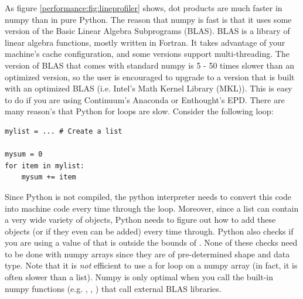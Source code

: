 As figure \ref{performance:fig:lineprofiler} shows, dot products are much faster in numpy than in pure Python.  The reason that numpy is fast is that it uses some version of the Basic Linear Algebra Subprograms (BLAS).  BLAS is a library of linear algebra functions, mostly written in Fortran.  It takes advantage of your machine's cache configuration, and some versions support multi-threading.  The version of BLAS that comes with standard numpy is 5 - 50 times slower than an optimized version, so the user is encouraged to upgrade to a version that is built with an optimized BLAS (i.e. Intel's Math Kernel Library (MKL)).  This is easy to do if you are using Continuum's Anaconda or Enthought's EPD.  There are many reason's that Python for loops are slow.  Consider the following loop:
\begin{verbatim}
mylist = ... # Create a list

mysum = 0
for item in mylist:
    mysum += item
\end{verbatim}
Since Python is not compiled, the python interpreter needs to convert this code into machine code every time through the loop.  Moreover, since a list can contain a very wide variety of objects, Python needs to figure out how to add these objects (or if they even can be added) every time through.  Python also checks if you are using a value of  that is outside the bounds of .  None of these checks need to be done with numpy arrays since they are of pre-determined shape and data type.  Note that it is \emph{not} efficient to use a for loop on a numpy array (in fact, it is often slower than a list).  Numpy is only optimal when you call the built-in numpy functions (e.g. , , ) that call external BLAS libraries.

